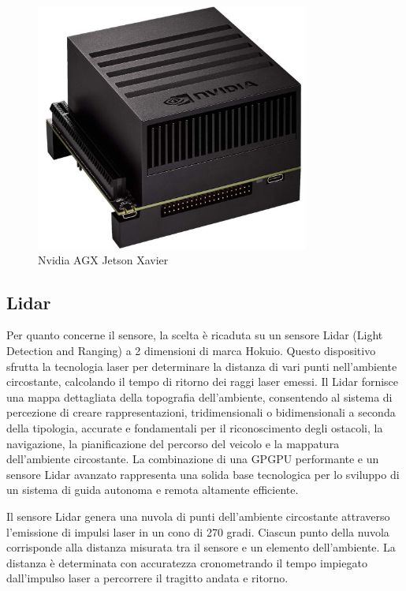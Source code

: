 \begin{figure}[H]
  \centering
  \includegraphics[width=0.8\textwidth]{figures/xavier.jpg}
  \caption{Nvidia AGX Jetson Xavier}
  \label{Nvidia AGX Jetson Xavier}
\end{figure}

\subsection{Lidar}
Per quanto concerne il sensore, la scelta è ricaduta su un sensore Lidar (Light Detection and Ranging) a 2 dimensioni di marca Hokuio. Questo dispositivo sfrutta la tecnologia laser per determinare la distanza di vari punti nell'ambiente circostante, calcolando il tempo di ritorno dei raggi laser emessi. Il Lidar fornisce una mappa dettagliata della topografia dell'ambiente, consentendo al sistema di percezione di creare rappresentazioni, tridimensionali o bidimensionali a seconda della tipologia, accurate e fondamentali per il riconoscimento degli ostacoli, la navigazione, la pianificazione del percorso del veicolo e la mappatura dell'ambiente circostante. La combinazione di una GPGPU performante e un sensore Lidar avanzato rappresenta una solida base tecnologica per lo sviluppo di un sistema di guida autonoma e remota altamente efficiente.

\noindent Il sensore Lidar genera una nuvola di punti dell'ambiente circostante attraverso l'emissione di impulsi laser in un cono di 270 gradi. Ciascun punto della nuvola corrisponde alla distanza misurata tra il sensore e un elemento dell'ambiente. La distanza è determinata con accuratezza cronometrando il tempo impiegato dall'impulso laser a percorrere il tragitto andata e ritorno.

